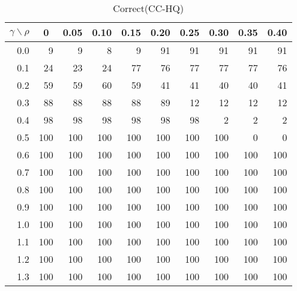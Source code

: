 \documentclass[12pt]{article}
\begin{document}
%
\begin{table}[!tbp]
\caption{Correct(CC-HQ)}
 \begin{center}
 \begin{tabular}{r|rrrrrrrrr}\hline\hline
\multicolumn{1}{c|}{$\gamma\backslash\rho$}&\multicolumn{1}{c}{0}&\multicolumn{1}{c}{0.05}&\multicolumn{1}{c}{0.10}&\multicolumn{1}{c}{0.15}&\multicolumn{1}{c}{0.20}&\multicolumn{1}{c}{0.25}&\multicolumn{1}{c}{0.30}&\multicolumn{1}{c}{0.35}&\multicolumn{1}{c}{0.40}\tabularnewline
\hline

0.0&  9&  9&  8&  9& 91& 91& 91& 91& 91\tabularnewline
0.1& 24& 23& 24& 77& 76& 77& 77& 77& 76\tabularnewline
0.2& 59& 59& 60& 59& 41& 41& 40& 40& 41\tabularnewline
0.3& 88& 88& 88& 88& 89& 12& 12& 12& 12\tabularnewline
0.4& 98& 98& 98& 98& 98& 98&  2&  2&  2\tabularnewline
0.5&100&100&100&100&100&100&100&  0&  0\tabularnewline
0.6&100&100&100&100&100&100&100&100&100\tabularnewline
0.7&100&100&100&100&100&100&100&100&100\tabularnewline
0.8&100&100&100&100&100&100&100&100&100\tabularnewline
0.9&100&100&100&100&100&100&100&100&100\tabularnewline
1.0&100&100&100&100&100&100&100&100&100\tabularnewline
1.1&100&100&100&100&100&100&100&100&100\tabularnewline
1.2&100&100&100&100&100&100&100&100&100\tabularnewline
1.3&100&100&100&100&100&100&100&100&100\tabularnewline
\hline
\end{tabular}

\end{center}

\end{table}
\end{document}
